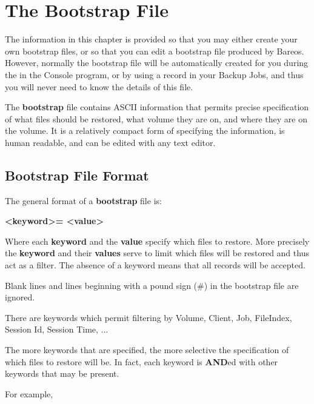 
\chapter{The Bootstrap File}
\label{BootstrapChapter}



The information in this chapter is provided so that you may either create your
own bootstrap files, or so that you can edit a bootstrap file produced by
Bareos. However, normally the bootstrap file will be automatically created
for you during the  in the Console program, or
by using a
 record in your Backup
Jobs, and thus you will never need to know the details of this file.

The {\bf bootstrap} file contains ASCII information that permits precise
specification of what files should be restored, what volume they are on,
and where they are on the volume. It is a relatively compact
form of specifying the information, is human readable, and can be edited with
any text editor.

\section{Bootstrap File Format}

The general format of a {\bf bootstrap} file is:

{\bf {\textless}keyword{\textgreater}= {\textless}value{\textgreater}}

Where each {\bf keyword} and the {\bf value} specify which files to restore.
More precisely the {\bf keyword} and their {\bf values} serve to limit which
files will be restored and thus act as a filter. The absence of a keyword
means that all records will be accepted.

Blank lines and lines beginning with a pound sign (\#) in the bootstrap file
are ignored.

There are keywords which permit filtering by Volume, Client, Job, FileIndex,
Session Id, Session Time, ...

The more keywords that are specified, the more selective the specification of
which files to restore will be. In fact, each keyword is {\bf AND}ed with
other keywords that may be present.

For example,

